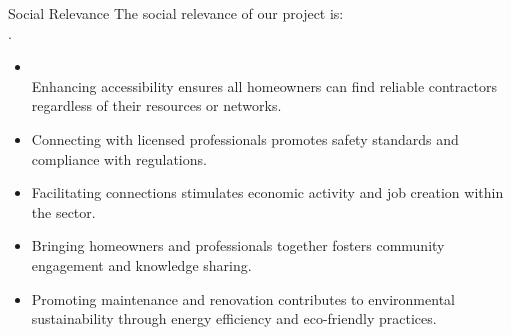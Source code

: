 \documentclass{beamer} %
\begin{document}
\begin{frame}{Social Relevance}
    The social relevance of our project is:\\.
     \begin{minipage}{1\textwidth}
            \begin{itemize}
                \item \\Enhancing accessibility ensures all homeowners can find reliable contractors regardless of their resources or networks.

                \item Connecting with licensed professionals promotes safety standards and compliance with regulations.

                \item Facilitating connections stimulates economic activity and job creation within the sector.

                \item Bringing homeowners and professionals together fosters community engagement and knowledge sharing.

                \item Promoting maintenance and renovation contributes to environmental sustainability through energy efficiency and eco-friendly practices.
            \end{itemize}
        \end{minipage}
    
    \vspace{10pt} %
    \begin{figure}
        \hfill
    \end{figure}
\end{frame}
\end{document}
